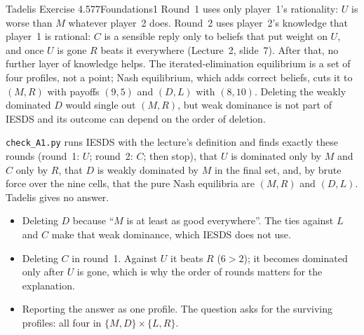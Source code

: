 \begin{exsol}{Tadelis Exercise 4.5}{77}{Foundations}{1}
\interp Round~1 uses only player~1's rationality: $U$ is worse than $M$ whatever player~2 does.
Round~2 uses player~2's knowledge that player~1 is rational: $C$ is a sensible reply only to
beliefs that put weight on $U$, and once $U$ is gone $R$ beats it everywhere (Lecture~2,
slide~7). After that, no further layer of knowledge helps. The iterated-elimination equilibrium
is a set of four profiles, not a point; Nash equilibrium, which adds correct beliefs, cuts it to
$(M,R)$ with payoffs $(9,5)$ and $(D,L)$ with $(8,10)$. Deleting the weakly dominated $D$ would
single out $(M,R)$, but weak dominance is not part of IESDS and its outcome can depend on the
order of deletion.

\verify \texttt{check\_A1.py} runs IESDS with the lecture's definition and finds exactly these
rounds (round~1: $U$; round~2: $C$; then stop), that $U$ is dominated only by $M$ and $C$ only by
$R$, that $D$ is weakly dominated by $M$ in the final set, and, by brute force over the nine
cells, that the pure Nash equilibria are $(M,R)$ and $(D,L)$. Tadelis gives no answer.

\mistakes
\begin{itemize}
  \item Deleting $D$ because ``$M$ is at least as good everywhere''. The ties against $L$ and $C$
  make that weak dominance, which IESDS does not use.
  \item Deleting $C$ in round~1. Against $U$ it beats $R$ ($6 > 2$); it becomes dominated only
  after $U$ is gone, which is why the order of rounds matters for the explanation.
  \item Reporting the answer as one profile. The question asks for the surviving profiles: all
  four in $\{M,D\}\times\{L,R\}$.
\end{itemize}

\end{exsol}
